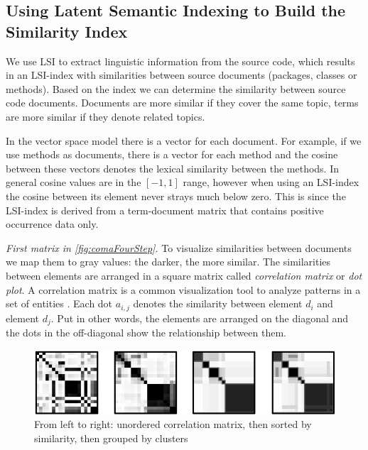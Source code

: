 \subsection{Using Latent Semantic Indexing to Build the Similarity Index}
\label{sec:lsi}

We use LSI to extract linguistic information from the source code, which results in an LSI-index with similarities between source documents (\ie packages, classes or methods). Based on the index we can determine the similarity between source code documents. Documents are more similar if they cover the same topic, terms are more similar if they denote related topics.

In the vector space model there is a vector for each document. For example, if we use methods as documents, there is a vector for each method and the cosine between these vectors denotes the lexical similarity between the methods. In general cosine values are in the $[-1,1]$ range, however when using an LSI-index the cosine between its element never strays much below zero. This is since the LSI-index is derived from a term-document matrix that contains positive occurrence data only.

\emph{First matrix in \autoref{fig:comaFourStep}.} To visualize similarities between documents we map them to gray values: the darker, the more similar. The similarities between elements are arranged in a square matrix called \emph{correlation matrix} or \emph{dot plot}. A correlation matrix is a common visualization tool to analyze patterns in a set of entities \cite{Ling73a}. Each dot $a_{i,j}$ denotes the similarity between element $d_i$ and element $d_j$. Put in other words, the elements are arranged on the diagonal and the dots in the off-diagonal show the relationship between them.

\begin{figure}[h]
  \includegraphics[width=\linewidth]{fig/hapax-clustering-example}
  \caption{From left to right: unordered correlation matrix, then sorted by similarity, then grouped by clusters}\label{fig:comaFourStep}
\end{figure}

